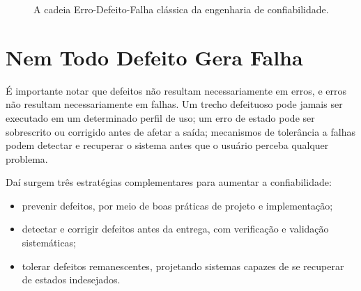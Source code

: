 \documentclass[12pt,a4paper]{report}
\begin{document}
\begin{figure}[h]
    \centering
    \caption{A cadeia Erro-Defeito-Falha clássica da engenharia de confiabilidade.}
\end{figure}


\section{Nem Todo Defeito Gera Falha}

É importante notar que defeitos não resultam necessariamente em erros, e
erros não resultam necessariamente em falhas. Um trecho defeituoso pode
jamais ser executado em um determinado perfil de uso; um erro de estado pode
ser sobrescrito ou corrigido antes de afetar a saída; mecanismos de
tolerância a falhas podem detectar e recuperar o sistema antes que o
usuário perceba qualquer problema.

Daí surgem três estratégias complementares para aumentar a confiabilidade:
\begin{itemize}[nosep]
    \item prevenir defeitos, por meio de boas práticas de projeto e
    implementação;
    \item detectar e corrigir defeitos antes da entrega, com verificação e
    validação sistemáticas;
    \item tolerar defeitos remanescentes, projetando sistemas capazes de
    se recuperar de estados indesejados.
\end{itemize}
\end{document}
